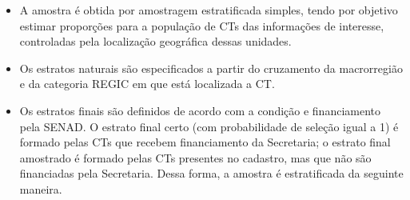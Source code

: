 
\begin{itemize}
	\item A amostra é obtida por amostragem estratificada simples, tendo por objetivo estimar proporções para a população de CTs das informações de interesse, controladas pela localização geográfica dessas unidades.
	\item Os estratos naturais são especificados a partir do cruzamento da macrorregião e da categoria REGIC em que está localizada a CT.
	\item Os estratos finais são definidos de acordo com a condição e financiamento pela SENAD. O estrato final certo (com probabilidade de seleção igual a 1) é formado pelas CTs que recebem financiamento da Secretaria; o estrato final amostrado é formado pelas CTs presentes no cadastro, mas que não são financiadas pela Secretaria. Dessa forma, a amostra é estratificada da seguinte maneira.
	
\end{itemize}


